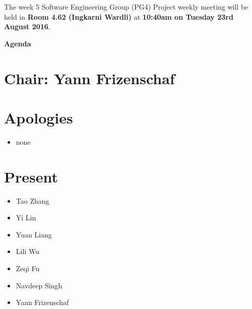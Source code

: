 \documentclass[11pt, a4paper]{article}
\begin{document}

\noindent The week 5 Software Engineering Group (PG4) Project weekly meeting will be held in {\bf Room 4.62 (Ingkarni Wardli)} at {\bf 10:40am on Tuesday 23rd August 2016}.



\vspace*{15pt}

\begin{center}

\huge \bf Agenda

\end{center}




\section*{Chair: Yann Frizenschaf}

\vspace*{10pt}




\section{Apologies}

\begin{itemize}

\item none

\end{itemize}




\section{Present}

\begin{itemize}

\item Tao Zhang

\item Yi Lin

\item Yuan Liang

\item Lili Wu

\item Zeqi Fu

\item Navdeep Singh

\item Yann Frizenschaf

\end{itemize}
\end{document}
